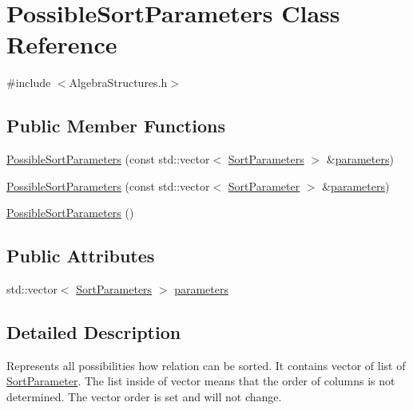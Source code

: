 \hypertarget{class_possible_sort_parameters}{\section{Possible\+Sort\+Parameters Class Reference}
\label{class_possible_sort_parameters}
}


{\ttfamily \#include $<$Algebra\+Structures.\+h$>$}

\subsection*{Public Member Functions}
\begin{DoxyCompactItemize}
\item 
\hyperlink{class_possible_sort_parameters_a08aad6763c347ad2a4dc2f20183efc24}{Possible\+Sort\+Parameters} (const std\+::vector$<$ \hyperlink{class_sort_parameters}{Sort\+Parameters} $>$ \&\hyperlink{class_possible_sort_parameters_ac7cd94ff83acacceb9adee62c4228e7f}{parameters})
\item 
\hyperlink{class_possible_sort_parameters_abf5abacee677c21a76de099cac60aa1a}{Possible\+Sort\+Parameters} (const std\+::vector$<$ \hyperlink{class_sort_parameter}{Sort\+Parameter} $>$ \&\hyperlink{class_possible_sort_parameters_ac7cd94ff83acacceb9adee62c4228e7f}{parameters})
\item 
\hyperlink{class_possible_sort_parameters_a0193033d9b018482a26f1501d489f4ba}{Possible\+Sort\+Parameters} ()
\end{DoxyCompactItemize}
\subsection*{Public Attributes}
\begin{DoxyCompactItemize}
\item 
std\+::vector$<$ \hyperlink{class_sort_parameters}{Sort\+Parameters} $>$ \hyperlink{class_possible_sort_parameters_ac7cd94ff83acacceb9adee62c4228e7f}{parameters}
\end{DoxyCompactItemize}


\subsection{Detailed Description}
Represents all possibilities how relation can be sorted. It contains vector of list of \hyperlink{class_sort_parameter}{Sort\+Parameter}. The list inside of vector means that the order of columns is not determined. The vector order is set and will not change. 

